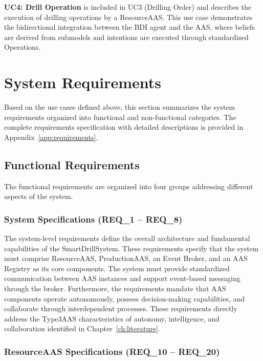 \textbf{UC4: Drill Operation} is included in UC3 (Drilling Order) and describes the execution of drilling operations by a ResourceAAS. This use case demonstrates the bidirectional integration between the \ac{BDI} agent and the \ac{AAS}, where beliefs are derived from submodels and intentions are executed through standardized Operations.

\section{System Requirements}
\label{sec:requirements}

Based on the use cases defined above, this section summarizes the system requirements organized into functional and non-functional categories. The complete requirements specification with detailed descriptions is provided in Appendix~\ref{app:requirements}.

\subsection{Functional Requirements}

The functional requirements are organized into four groups addressing different aspects of the system.

\subsubsection{System Specifications (REQ\_1 -- REQ\_8)}

The system-level requirements define the overall architecture and fundamental capabilities of the SmartDrillSystem. These requirements specify that the system must comprise ResourceAAS, ProductionAAS, an Event Broker, and an AAS Registry as its core components. The system must provide standardized communication between \ac{AAS} instances and support event-based messaging through the broker. Furthermore, the requirements mandate that \ac{AAS} components operate autonomously, possess decision-making capabilities, and collaborate through interdependent processes. These requirements directly address the \ac{Type3AAS} characteristics of autonomy, intelligence, and collaboration identified in Chapter~\ref{ch:literature}.

\subsubsection{ResourceAAS Specifications (REQ\_10 -- REQ\_20)}

